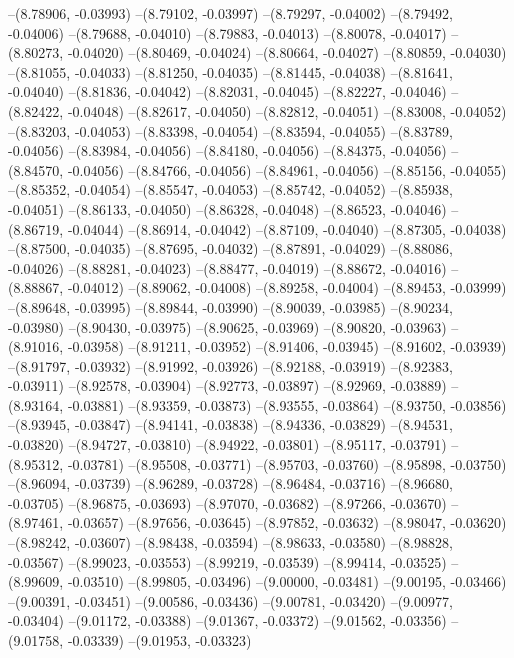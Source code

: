 --(8.78906, -0.03993)
--(8.79102, -0.03997)
--(8.79297, -0.04002)
--(8.79492, -0.04006)
--(8.79688, -0.04010)
--(8.79883, -0.04013)
--(8.80078, -0.04017)
--(8.80273, -0.04020)
--(8.80469, -0.04024)
--(8.80664, -0.04027)
--(8.80859, -0.04030)
--(8.81055, -0.04033)
--(8.81250, -0.04035)
--(8.81445, -0.04038)
--(8.81641, -0.04040)
--(8.81836, -0.04042)
--(8.82031, -0.04045)
--(8.82227, -0.04046)
--(8.82422, -0.04048)
--(8.82617, -0.04050)
--(8.82812, -0.04051)
--(8.83008, -0.04052)
--(8.83203, -0.04053)
--(8.83398, -0.04054)
--(8.83594, -0.04055)
--(8.83789, -0.04056)
--(8.83984, -0.04056)
--(8.84180, -0.04056)
--(8.84375, -0.04056)
--(8.84570, -0.04056)
--(8.84766, -0.04056)
--(8.84961, -0.04056)
--(8.85156, -0.04055)
--(8.85352, -0.04054)
--(8.85547, -0.04053)
--(8.85742, -0.04052)
--(8.85938, -0.04051)
--(8.86133, -0.04050)
--(8.86328, -0.04048)
--(8.86523, -0.04046)
--(8.86719, -0.04044)
--(8.86914, -0.04042)
--(8.87109, -0.04040)
--(8.87305, -0.04038)
--(8.87500, -0.04035)
--(8.87695, -0.04032)
--(8.87891, -0.04029)
--(8.88086, -0.04026)
--(8.88281, -0.04023)
--(8.88477, -0.04019)
--(8.88672, -0.04016)
--(8.88867, -0.04012)
--(8.89062, -0.04008)
--(8.89258, -0.04004)
--(8.89453, -0.03999)
--(8.89648, -0.03995)
--(8.89844, -0.03990)
--(8.90039, -0.03985)
--(8.90234, -0.03980)
--(8.90430, -0.03975)
--(8.90625, -0.03969)
--(8.90820, -0.03963)
--(8.91016, -0.03958)
--(8.91211, -0.03952)
--(8.91406, -0.03945)
--(8.91602, -0.03939)
--(8.91797, -0.03932)
--(8.91992, -0.03926)
--(8.92188, -0.03919)
--(8.92383, -0.03911)
--(8.92578, -0.03904)
--(8.92773, -0.03897)
--(8.92969, -0.03889)
--(8.93164, -0.03881)
--(8.93359, -0.03873)
--(8.93555, -0.03864)
--(8.93750, -0.03856)
--(8.93945, -0.03847)
--(8.94141, -0.03838)
--(8.94336, -0.03829)
--(8.94531, -0.03820)
--(8.94727, -0.03810)
--(8.94922, -0.03801)
--(8.95117, -0.03791)
--(8.95312, -0.03781)
--(8.95508, -0.03771)
--(8.95703, -0.03760)
--(8.95898, -0.03750)
--(8.96094, -0.03739)
--(8.96289, -0.03728)
--(8.96484, -0.03716)
--(8.96680, -0.03705)
--(8.96875, -0.03693)
--(8.97070, -0.03682)
--(8.97266, -0.03670)
--(8.97461, -0.03657)
--(8.97656, -0.03645)
--(8.97852, -0.03632)
--(8.98047, -0.03620)
--(8.98242, -0.03607)
--(8.98438, -0.03594)
--(8.98633, -0.03580)
--(8.98828, -0.03567)
--(8.99023, -0.03553)
--(8.99219, -0.03539)
--(8.99414, -0.03525)
--(8.99609, -0.03510)
--(8.99805, -0.03496)
--(9.00000, -0.03481)
--(9.00195, -0.03466)
--(9.00391, -0.03451)
--(9.00586, -0.03436)
--(9.00781, -0.03420)
--(9.00977, -0.03404)
--(9.01172, -0.03388)
--(9.01367, -0.03372)
--(9.01562, -0.03356)
--(9.01758, -0.03339)
--(9.01953, -0.03323)
